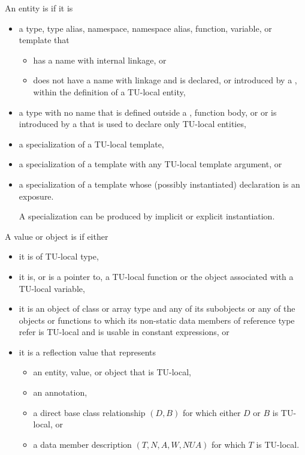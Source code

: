 \pnum
An entity is  if it is
\begin{itemize}
\item
a type, type alias, namespace, namespace alias, function, variable, or template that
\begin{itemize}
\item
has a name with internal linkage, or
\item
does not have a name with linkage and is declared,
or introduced by a ,
within the definition of a TU-local entity,
\end{itemize}
\item
a type with no name that is defined outside a
,
function body, or
or is introduced by a 
that is used to declare only TU-local entities,
\item
a specialization of a TU-local template,
\item
a specialization of a template with any TU-local template argument, or
\item
a specialization of a template
whose (possibly instantiated) declaration is an exposure.
\begin{note}
A specialization can be produced by implicit or explicit instantiation.
\end{note}
\end{itemize}

\pnum
A value or object is  if either
\begin{itemize}
\item
it is of TU-local type,
\item
it is, or is a pointer to,
a TU-local function or the object associated with a TU-local variable,
\item
it is an object of class or array type and
any of its subobjects or
any of the objects or functions
to which its non-static data members of reference type refer
is TU-local and is usable in constant expressions, or
\item
it is a reflection value that represents
\begin{itemize}
\item
an entity, value, or object that is TU-local,
\item
an annotation,
\item
a direct base class relationship $(D, B)$
for which either $D$ or $B$ is TU-local, or
\item
a data member description $(T, N, A, W, \mathit{NUA})$
for which $T$ is TU-local.
\end{itemize}
\end{itemize}

